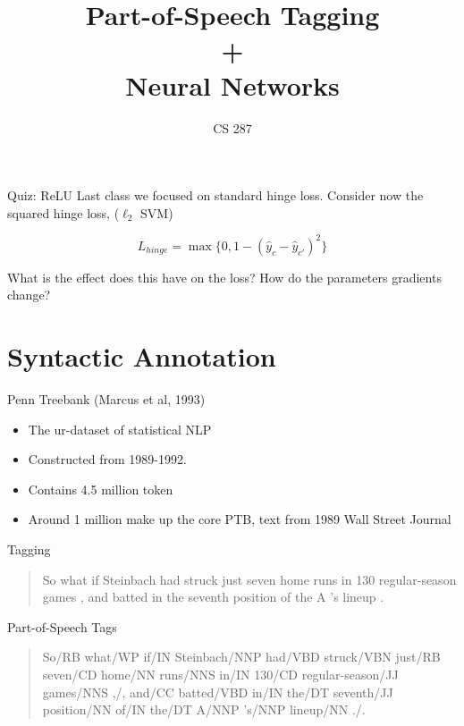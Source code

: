 \documentclass{beamer}
\title{Part-of-Speech Tagging \\ + \\ Neural Networks}
\date{}
\author{CS 287}
\begin{document}
\begin{frame}
  \titlepage
\end{frame}


\begin{frame}{Quiz: ReLU}
  Last class we focused on standard hinge loss. 
  Consider now the squared hinge loss, ($\ell_2$ SVM) 

  \[L_{hinge} = \max\{0, 1 - (\hat{y}_c - \hat{y}_{c'})^2 \} \] 

  What is the effect does this have on the loss?
  How do the parameters gradients change?
\end{frame}

\section{Syntactic Annotation}

\begin{frame}{Penn Treebank (Marcus et al, 1993)}
  \begin{itemize}
    \item The ur-dataset of statistical NLP
      \air 
    \item Constructed from 1989-1992.
      \air
    \item Contains 4.5 million token 
      \air 
    \item Around 1 million make up the core PTB, text from 1989 Wall Street Journal
  \end{itemize}
\end{frame}

\begin{frame}{Tagging}
    \begin{quote}
So
what
if
Steinbach
had
struck
just
seven
home
runs
in
130
regular-season
games
,
and
batted
in
the
seventh
position
of
the
A
's
lineup
.
  \end{quote}

\end{frame}

\begin{frame}{Part-of-Speech Tags}

  \begin{quote}
So/RB
what/WP
if/IN
Steinbach/NNP
had/VBD
struck/VBN
just/RB
seven/CD
home/NN
runs/NNS
in/IN
130/CD
regular-season/JJ
games/NNS
,/,
and/CC
batted/VBD
in/IN
the/DT
seventh/JJ
position/NN
of/IN
the/DT
A/NNP
's/NNP
lineup/NN
./.
  \end{quote}

\end{frame}
\end{document}
